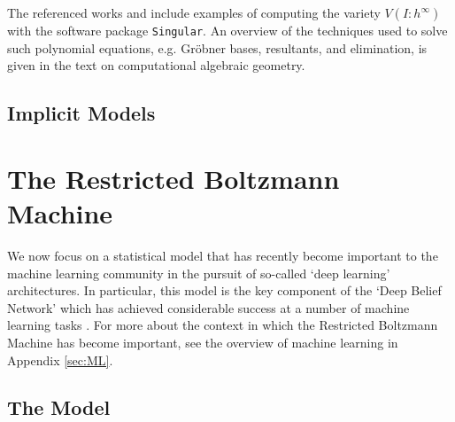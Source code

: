 \documentclass[11pt,titlepage]{article}
\numberwithin{equation}{section}
\begin{document}
    The referenced works \cite{ASCB} and \cite{DSS08} include examples of
    computing the variety $V(I : h^\infty)$ with the software package
    \texttt{Singular}.  An overview of the techniques used to solve such
    polynomial equations, e.g. Gröbner bases, resultants, and elimination, is
    given in the text \cite{CLO05} on computational algebraic geometry.

\subsection{Implicit Models}




\section{The Restricted Boltzmann Machine}

    We now focus on a statistical model that has recently become important to
    the machine learning community in the pursuit of so-called `deep learning'
    architectures.  In particular, this model is the key component of the `Deep
    Belief Network' which has achieved considerable success at a number of
    machine learning tasks \cite{Hin07}.  For more about the context in which
    the Restricted Boltzmann Machine has become important, see the overview of
    machine learning in Appendix \ref{sec:ML}.

\subsection{The Model}
    \label{sec:rbm-def}
\end{document}
